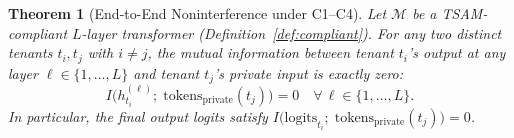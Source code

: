 \documentclass[11pt]{article}
\newtheorem{theorem}{Theorem}
\begin{document}
\begin{theorem}[End-to-End Noninterference under C1--C4]
\label{thm:e2e}
Let $\mathcal{M}$ be a TSAM-compliant $L$-layer transformer
(Definition~\ref{def:compliant}).  For any two distinct tenants
$t_i, t_j$ with $i \neq j$, the mutual information between tenant
$t_i$'s output at \emph{any} layer $\ell \in \{1, \ldots, L\}$
and tenant $t_j$'s private input is exactly zero:
\begin{equation}
    I\!\big(h^{(\ell)}_{t_i};\; \mathrm{tokens}_{\mathrm{private}}(t_j)\big) = 0
    \quad \forall\, \ell \in \{1, \ldots, L\}.
\end{equation}
In particular, the final output logits satisfy
$I\!\big(\mathrm{logits}_{t_i};\; \mathrm{tokens}_{\mathrm{private}}(t_j)\big) = 0$.
\end{theorem}
\end{document}
